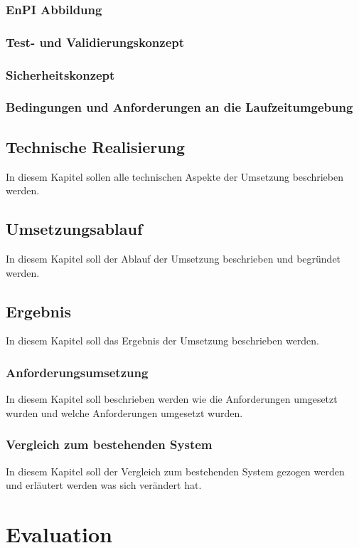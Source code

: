 \documentclass[a4paper,10pt,twoside]{report}
\begin{document}
\subsection{EnPI Abbildung}
\subsection{Test- und Validierungskonzept}
\subsection{Sicherheitskonzept}
\subsection{Bedingungen und Anforderungen an die Laufzeitumgebung}

\section{Technische Realisierung}
In diesem Kapitel sollen alle technischen Aspekte der Umsetzung beschrieben werden.
\section{Umsetzungsablauf}
In diesem Kapitel soll der Ablauf der Umsetzung beschrieben und begründet werden.
\section{Ergebnis}
In diesem Kapitel soll das Ergebnis der Umsetzung beschrieben werden.
\subsection{Anforderungsumsetzung}
In diesem Kapitel soll beschrieben werden wie die Anforderungen umgesetzt wurden und welche Anforderungen umgesetzt wurden.
\subsection{Vergleich zum bestehenden System}
In diesem Kapitel soll der Vergleich zum bestehenden System gezogen werden und erläutert werden was sich verändert hat.



\chapter{Evaluation}
\end{document}

